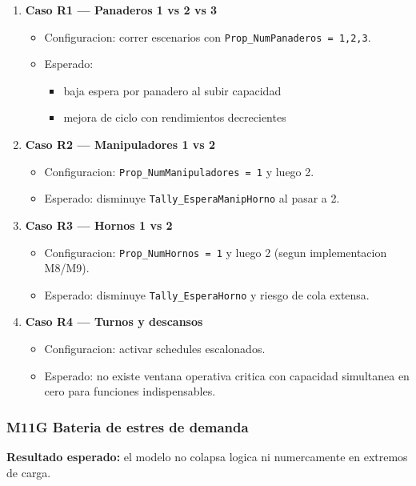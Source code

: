 \documentclass[11pt]{article}
\newcommand{\simio}[1]{\texttt{#1}}
\newcommand{\state}[1]{\texttt{#1}}
\begin{document}
\begin{enumerate}
  \item \textbf{Caso R1 --- Panaderos 1 vs 2 vs 3}
  \begin{itemize}
    \item Configuracion: correr escenarios con \state{Prop\_NumPanaderos = 1,2,3}.
    \item Esperado:
    \begin{itemize}
      \item baja espera por panadero al subir capacidad
      \item mejora de ciclo con rendimientos decrecientes
    \end{itemize}
  \end{itemize}
  \item \textbf{Caso R2 --- Manipuladores 1 vs 2}
  \begin{itemize}
    \item Configuracion: \state{Prop\_NumManipuladores = 1} y luego 2.
    \item Esperado: disminuye \simio{Tally\_EsperaManipHorno} al pasar a 2.
  \end{itemize}
  \item \textbf{Caso R3 --- Hornos 1 vs 2}
  \begin{itemize}
    \item Configuracion: \state{Prop\_NumHornos = 1} y luego 2 (segun implementacion M8/M9).
    \item Esperado: disminuye \simio{Tally\_EsperaHorno} y riesgo de cola extensa.
  \end{itemize}
  \item \textbf{Caso R4 --- Turnos y descansos}
  \begin{itemize}
    \item Configuracion: activar schedules escalonados.
    \item Esperado: no existe ventana operativa critica con capacidad simultanea en cero para funciones indispensables.
  \end{itemize}
\end{enumerate}

\subsubsection{M11G Bateria de estres de demanda}
\textbf{Resultado esperado:} el modelo no colapsa logica ni numercamente en extremos de carga.
\end{document}
